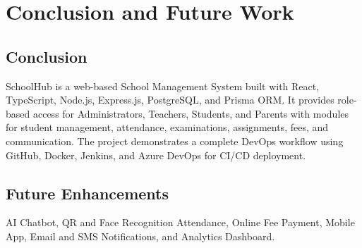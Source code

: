 \chapter{Conclusion and Future Work}

\section{Conclusion}

SchoolHub is a web-based School Management System built with React, TypeScript, Node.js, Express.js, PostgreSQL, and Prisma ORM. It provides role-based access for Administrators, Teachers, Students, and Parents with modules for student management, attendance, examinations, assignments, fees, and communication. The project demonstrates a complete DevOps workflow using GitHub, Docker, Jenkins, and Azure DevOps for CI/CD deployment.

\section{Future Enhancements}

AI Chatbot, QR and Face Recognition Attendance, Online Fee Payment, Mobile App, Email and SMS Notifications, and Analytics Dashboard.
